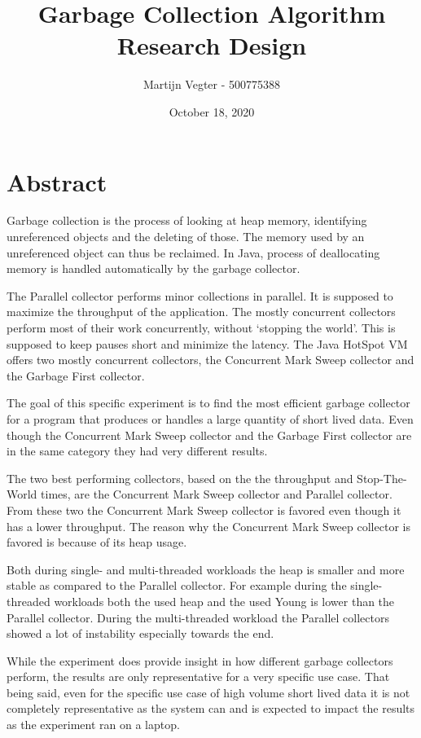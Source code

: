 \documentclass[11pt,a4paper]{article}
\title{Garbage Collection Algorithm\\\small{Research Design}}
\author{Martijn Vegter - 500775388}
\date{October 18, 2020}
\begin{document}
\maketitle

\newpage
\section*{Abstract}
Garbage collection is the process of looking at heap memory, identifying unreferenced objects and the deleting of those. The memory used by an unreferenced object can thus be reclaimed. In Java, process of deallocating memory is handled automatically by the garbage collector.

The Parallel collector performs minor collections in parallel. It is supposed to maximize the throughput of the application. The mostly concurrent collectors perform most of their work concurrently, without `stopping the world'. This is supposed to keep pauses short and minimize the latency. The Java HotSpot VM offers two mostly concurrent collectors, the Concurrent Mark Sweep collector and the Garbage First collector.

The goal of this specific experiment is to find the most efficient garbage collector for a program that produces or handles a large quantity of short lived data. Even though the Concurrent Mark Sweep collector and the Garbage First collector are in the same category they had very different results.

The two best performing collectors, based on the the throughput and Stop-The-World times, are the Concurrent Mark Sweep collector and Parallel collector. From these two the Concurrent Mark Sweep collector is favored even though it has a lower throughput. The reason why the Concurrent Mark Sweep collector is favored is because of its heap usage.

Both during single- and multi-threaded workloads the heap is smaller and more stable as compared to the Parallel collector. For example during the single-threaded workloads both the used heap and the used Young is lower than the Parallel collector. During the multi-threaded workload the Parallel collectors showed a lot of instability especially towards the end.

While the experiment does provide insight in how different garbage collectors perform, the results are only representative for a very specific use case. That being said, even for the specific use case of high volume short lived data it is not completely representative as the system can and is expected to impact the results as the experiment ran on a laptop.
\end{document}
